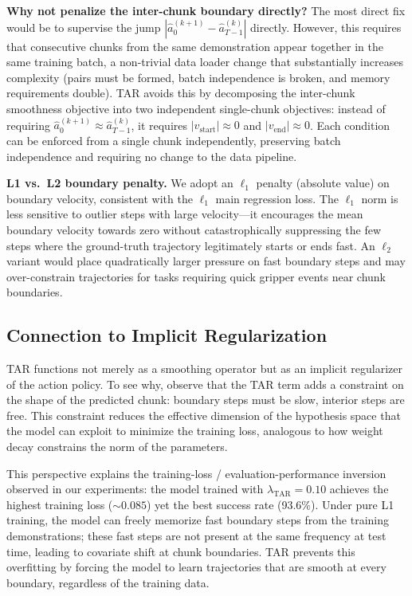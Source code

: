\textbf{Why not penalize the inter-chunk boundary directly?} The most direct fix would be to supervise the jump $|\hat{a}^{(k+1)}_{0} - \hat{a}^{(k)}_{T-1}|$ directly. However, this requires that consecutive chunks from the same demonstration appear together in the same training batch, a non-trivial data loader change that substantially increases complexity (pairs must be formed, batch independence is broken, and memory requirements double). TAR avoids this by decomposing the inter-chunk smoothness objective into two independent single-chunk objectives: instead of requiring $\hat{a}^{(k+1)}_{0} \approx \hat{a}^{(k)}_{T-1}$, it requires $|v_{\text{start}}| \approx 0$ and $|v_{\text{end}}| \approx 0$. Each condition can be enforced from a single chunk independently, preserving batch independence and requiring no change to the data pipeline.

\textbf{L1 vs.\ L2 boundary penalty.} We adopt an $\ell_1$ penalty (absolute value) on boundary velocity, consistent with the $\ell_1$ main regression loss. The $\ell_1$ norm is less sensitive to outlier steps with large velocity---it encourages the mean boundary velocity towards zero without catastrophically suppressing the few steps where the ground-truth trajectory legitimately starts or ends fast. An $\ell_2$ variant would place quadratically larger pressure on fast boundary steps and may over-constrain trajectories for tasks requiring quick gripper events near chunk boundaries.

\subsection{Connection to Implicit Regularization}
TAR functions not merely as a smoothing operator but as an implicit regularizer of the action policy. To see why, observe that the TAR term adds a constraint on the shape of the predicted chunk: boundary steps must be slow, interior steps are free. This constraint reduces the effective dimension of the hypothesis space that the model can exploit to minimize the training loss, analogous to how weight decay constrains the norm of the parameters.

This perspective explains the training-loss / evaluation-performance inversion observed in our experiments: the model trained with $\lambda_{\text{TAR}}=0.10$ achieves the highest training loss (${\sim}0.085$) yet the best success rate (93.6\%). Under pure L1 training, the model can freely memorize fast boundary steps from the training demonstrations; these fast steps are not present at the same frequency at test time, leading to covariate shift at chunk boundaries. TAR prevents this overfitting by forcing the model to learn trajectories that are smooth at every boundary, regardless of the training data.

